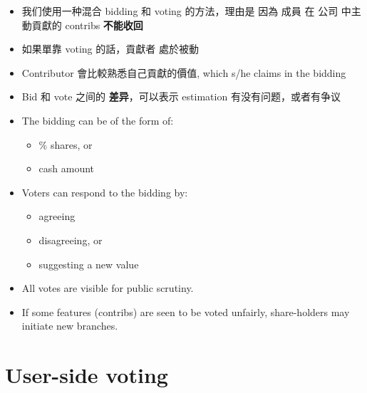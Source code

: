 \documentclass[12pt, orivec]{article}
\newcommand{\cc}[2]{#1}
\newcommand{\cc}[2]{#2}
\begin{document}
\begin{itemize}
	\item \cc{
	我们使用一种混合 bidding 和 voting 的方法，理由是 因為 成員 在 公司 中主動貢獻的 contribs \textbf{不能收回}}{
	We consider a mixed voting-bidding scheme, the rationale being that a member's voluntary contribution cannot be \textbf{retracted}
	}
	
	\item \cc{
	如果單靠 voting 的話，貢獻者 處於被動}{
	If we rely solely on voting, contributors are in a passive position
	}

	\item \cc{
	Contributor 會比較熟悉自己貢獻的價值, which s/he claims in the bidding}{
	Contributors would be more in touch with the value of their own contributions, which s/he claims in the bidding
	}
	
	\item \cc{
	Bid 和 vote 之间的 \textbf{差异}，可以表示 estimation 有没有问题，或者有争议}{
	If there is a big difference between bid and voted values, it may indicate an inaccurate assessment or a disagreement.
	}

	\item The bidding can be of the form of:
	\begin{itemize}
		\item \% shares, or
		\item cash amount
	\end{itemize}

	\item Voters can respond to the bidding by:
	\begin{itemize}
		\item agreeing
		\item disagreeing, or
		\item suggesting a new value
	\end{itemize}


	\item All votes are visible for public scrutiny.

	\item If some features (contribs) are seen to be voted unfairly, share-holders may initiate new branches.
\end{itemize}

\secttoc
\section{User-side voting}
\end{document}
